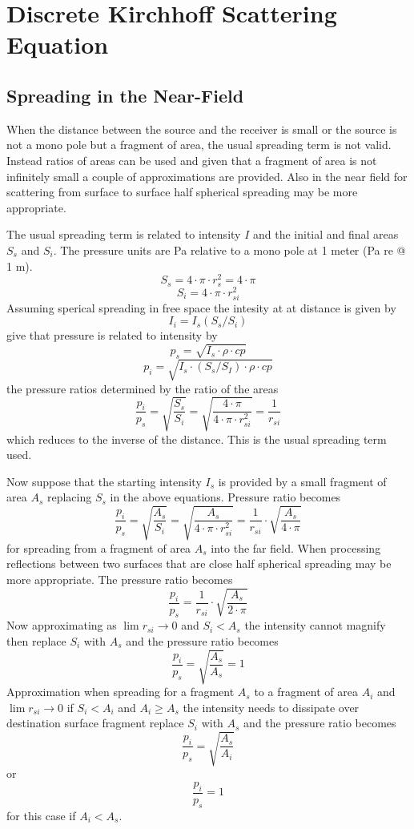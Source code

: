 \documentclass{article}
\begin{document}
\section{Discrete Kirchhoff Scattering Equation}


\subsection{Spreading in the Near-Field}
When the distance between the source and the receiver is small or the source is not a mono pole but a fragment of area, the usual spreading term is not valid.
Instead ratios of areas can be used and given that a fragment of area is not infinitely small a couple of approximations are provided. Also in the near field for scattering from surface to surface half spherical spreading may be more appropriate.

The usual spreading term is related to intensity $I$ and the initial and final areas $S_s$ and $S_i$. The pressure units are Pa relative to a mono pole at 1 meter (Pa re @ 1 m).
\[
S_s = 4\cdot \pi \cdot r_s^2  = 4 \cdot \pi
\]
\[
S_i = 4 \cdot \pi \cdot r_{si}^2
\]
Assuming sperical spreading in free space the intesity at at distance is given by
\[
I_i = I_s (S_s/S_i)
\]
give that pressure is related to intensity by
\[
p_s = \sqrt{I_s \cdot \rho \cdot cp}
\]
\[
p_i = \sqrt{I_s \cdot (S_s/S_I) \cdot \rho \cdot cp}
\]
the pressure ratios determined by the ratio of the areas
\[
\frac{p_i}{p_s} = \sqrt{\frac{S_s}{S_i}} = \sqrt{\frac{4\cdot \pi}{4\cdot \pi \cdot r_{si}^2}} = \frac{1}{r_{si}}
\]
which reduces to the inverse of the distance. This is the usual spreading term used.

Now suppose that the starting intensity $I_s$ is provided by a small fragment of area $A_s$ replacing $S_s$ in the above equations. Pressure ratio becomes
\[
\frac{p_i}{p_s} = \sqrt{\frac{A_s}{S_i}} = \sqrt{\frac{A_s}{4\cdot \pi \cdot r_{si}^2}} = \frac{1}{r_{si}} \cdot \sqrt{\frac{A_s}{4\cdot \pi}}
\]
for spreading from a fragment of area $A_s$ into the far field. When processing reflections between two surfaces that are close half spherical spreading may be more appropriate. The pressure ratio becomes
\[
\frac{p_i}{p_s} = \frac{1}{r_{si}} \cdot \sqrt{\frac{A_s}{2\cdot \pi}}
\]
Now approximating as $\lim{r_{si} \to 0}$ and $S_i < A_s$ the intensity cannot magnify then replace  $S_i$ with $A_s$ and the pressure ratio becomes
\[
\frac{p_i}{p_s} = \sqrt{\frac{A_s}{A_s}} = 1
\]
Approximation when spreading for a fragment $A_s$ to a fragment of area $A_i$ and $\lim{r_{si} \to 0}$ if $S_i < A_i$ and $A_i \geq A_s$ the intensity needs to dissipate over destination surface fragment replace  $S_i$ with $A_s$ and the pressure ratio becomes
\[
\frac{p_i}{p_s} = \sqrt{\frac{A_s}{A_i}}
\]
or
\[
\frac{p_i}{p_s} = 1
\]
for this case if $A_i < A_s$.
\end{document}

